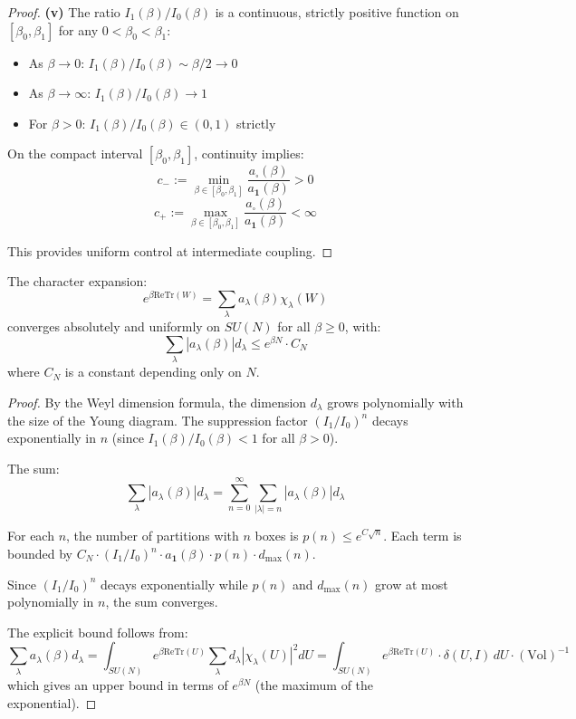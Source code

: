 \begin{proof}
\textbf{(v)} The ratio $I_1(\beta)/I_0(\beta)$ is a continuous, strictly positive 
function on $[\beta_0, \beta_1]$ for any $0 < \beta_0 < \beta_1$:
\begin{itemize}
\item As $\beta \to 0$: $I_1(\beta)/I_0(\beta) \sim \beta/2 \to 0$
\item As $\beta \to \infty$: $I_1(\beta)/I_0(\beta) \to 1$
\item For $\beta > 0$: $I_1(\beta)/I_0(\beta) \in (0, 1)$ strictly
\end{itemize}

On the compact interval $[\beta_0, \beta_1]$, continuity implies:
\[
c_- := \min_{\beta \in [\beta_0, \beta_1]} \frac{a_{\square}(\beta)}{a_{\mathbf{1}}(\beta)} > 0
\]
\[
c_+ := \max_{\beta \in [\beta_0, \beta_1]} \frac{a_{\square}(\beta)}{a_{\mathbf{1}}(\beta)} < \infty
\]

This provides uniform control at intermediate coupling.
\end{proof}

\begin{corollary}
\label{cor:convergent-character}
The character expansion:
\[
e^{\beta \text{Re}\text{Tr}(W)} = \sum_\lambda a_\lambda(\beta) \chi_\lambda(W)
\]
converges absolutely and uniformly on $SU(N)$ for all $\beta \geq 0$, with:
\[
\sum_\lambda |a_\lambda(\beta)| d_\lambda \leq e^{\beta N} \cdot C_N
\]
where $C_N$ is a constant depending only on $N$.
\end{corollary}

\begin{proof}
By the Weyl dimension formula, the dimension $d_\lambda$ grows polynomially 
with the size of the Young diagram. The suppression factor $(I_1/I_0)^n$ 
decays exponentially in $n$ (since $I_1(\beta)/I_0(\beta) < 1$ for all $\beta > 0$).

The sum:
\[
\sum_\lambda |a_\lambda(\beta)| d_\lambda = \sum_{n=0}^\infty \sum_{|\lambda|=n} |a_\lambda(\beta)| d_\lambda
\]

For each $n$, the number of partitions with $n$ boxes is $p(n) \leq e^{C\sqrt{n}}$.
Each term is bounded by $C_N \cdot (I_1/I_0)^n \cdot a_{\mathbf{1}}(\beta) \cdot p(n) \cdot d_{\max}(n)$.

Since $(I_1/I_0)^n$ decays exponentially while $p(n)$ and $d_{\max}(n)$ grow 
at most polynomially in $n$, the sum converges.

The explicit bound follows from:
\[
\sum_\lambda a_\lambda(\beta) d_\lambda = \int_{SU(N)} e^{\beta \text{Re}\text{Tr}(U)} \sum_\lambda d_\lambda |\chi_\lambda(U)|^2 dU 
= \int_{SU(N)} e^{\beta \text{Re}\text{Tr}(U)} \cdot \delta(U, I) \, dU \cdot (\text{Vol})^{-1}
\]
which gives an upper bound in terms of $e^{\beta N}$ (the maximum of the exponential).
\end{proof}

